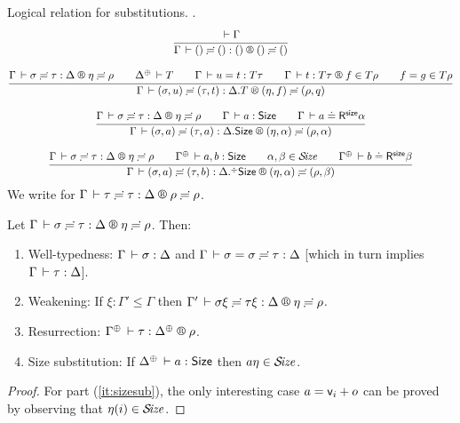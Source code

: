 \documentclass[acmlarge,review,anonymous]{acmart}\settopmatter{printfolios=true}
\begin{document}
Logical relation for substitutions.
\fbox{$\LRSub \Gamma \sigma \tau \Delta \eta \rho$}.
\begin{gather*}
  \ru{\der \Gamma
    }{\LRSub \Gamma {\sempty} {\sempty} {\cempty} {\sempty} {\sempty}}
\\[2ex]
  \ru{\LRSub \Gamma \sigma \tau \Delta \eta \rho \qquad
      \resurrect \Delta \der T \qquad
      \Gamma \der u = t : T\tau \qquad
      \LR \Gamma t {T \tau} f {T \rho} \qquad
      f = g \in T\rho
    }{\LRSub \Gamma {(\sigma,u)} {(\tau,t)} {\cext \Delta T} {(\eta,f)} {(\rho,q)}}
\\[2ex]
  \ru{\LRSub \Gamma \sigma \tau \Delta \eta \rho \qquad
      \Gamma \der a : \Size \qquad
      \LRSize \Gamma a \alpha
    }{\LRSub \Gamma {(\sigma,a)} {(\tau,a)} {\cext \Delta \Size} {(\eta,\alpha)} {(\rho,\alpha)}}
\\[2ex]
  \ru{\LRSub \Gamma \sigma \tau \Delta \eta \rho \qquad
      \resurrect \Gamma \der a, b : \Size \qquad
      \alpha,\beta \in \SIZE \qquad
      \LRSize {\resurrect\Gamma} b \beta
    }{\LRSub \Gamma {(\sigma,a)} {(\tau,b)} {\erext \Delta \Size} {(\eta,\alpha)} {(\rho,\beta)}}
\end{gather*}
We write \fbox{$\LRS \Gamma \tau \Delta \rho$} for $\LRSub \Gamma \tau \tau \Delta \rho \rho$.

\begin{lemma}
  \label{lem:wklrsub}
  Let $\LRSub \Gamma \sigma \tau \Delta \eta \rho$. Then:
  \begin{enumerate}
  \item Well-typedness: $\Gamma \,\vdash \sigma : \Delta$
   and $\Gamma \,\vdash \sigma = \sigma \risingdotseq \tau : \Delta$
   [which in turn implies $\Gamma \,\vdash \tau : \Delta$].
  \item Weakening:
  If\/ $\xi : \Gamma' \leq \Gamma$ then
  $\LRSub{\Gamma'}{\sigma\xi}{\tau\xi}{\Delta}\eta\rho$.
  \item Resurrection:
  $\LRS {\resurrect\Gamma} \tau {\resurrect\Delta} \rho$.
  \item \label{it:sizesub} Size substitution:
  If\/ $\resurrect\Delta \der a : \Size$ then $a\eta \in \mathcal{S}\!\mathit{ize}$.
  \end{enumerate}
\end{lemma}
\begin{proof}
  For part (\ref{it:sizesub}), the only interesting case $a = \mathsf{v}_{i} + o$ can be proved by observing that $\eta(i) \in \mathcal{S}\!\mathit{ize}$.
\end{proof}
\end{document}
